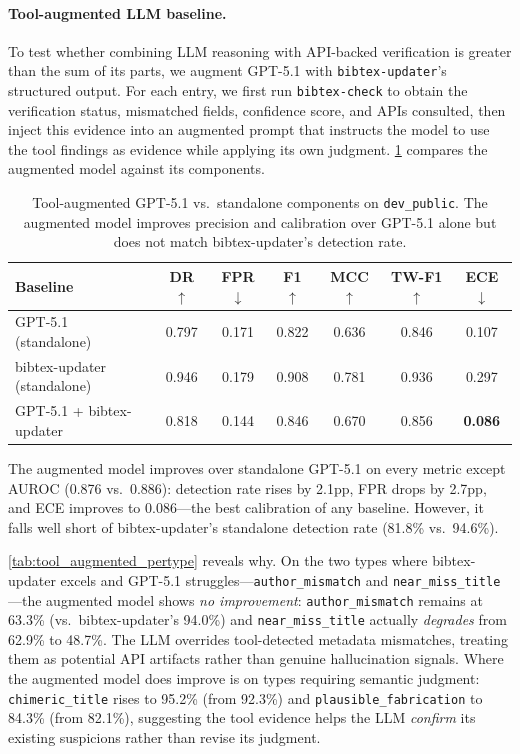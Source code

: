 \paragraph{Tool-augmented LLM baseline.}
\label{app:tool_augmented}
To test whether combining LLM reasoning with API-backed verification is greater than the sum of its parts, we augment GPT-5.1 with \texttt{bibtex-updater}'s structured output.
For each entry, we first run \texttt{bibtex-check} to obtain the verification status, mismatched fields, confidence score, and APIs consulted, then inject this evidence into an augmented prompt that instructs the model to use the tool findings as evidence while applying its own judgment.
\cref{tab:tool_augmented} compares the augmented model against its components.

\begin{table}[t]
\caption{Tool-augmented GPT-5.1 vs.\ standalone components on \texttt{dev\_public}. The augmented model improves precision and calibration over GPT-5.1 alone but does not match bibtex-updater's detection rate.}
\label{tab:tool_augmented}
\centering
\small
\begin{tabular}{lcccccc}
\toprule
\textbf{Baseline} & \textbf{DR $\uparrow$} & \textbf{FPR $\downarrow$} & \textbf{F1 $\uparrow$} & \textbf{MCC $\uparrow$} & \textbf{TW-F1 $\uparrow$} & \textbf{ECE $\downarrow$} \\
\midrule
GPT-5.1 (standalone)        & 0.797 & 0.171 & 0.822 & 0.636 & 0.846 & 0.107 \\
bibtex-updater (standalone)  & 0.946 & 0.179 & 0.908 & 0.781 & 0.936 & 0.297 \\
GPT-5.1 + bibtex-updater     & 0.818 & 0.144 & 0.846 & 0.670 & 0.856 & \textbf{0.086} \\
\bottomrule
\end{tabular}
\end{table}

The augmented model improves over standalone GPT-5.1 on every metric except AUROC (0.876 vs.\ 0.886): detection rate rises by 2.1pp, FPR drops by 2.7pp, and ECE improves to 0.086---the best calibration of any baseline.
However, it falls well short of bibtex-updater's standalone detection rate (81.8\% vs.\ 94.6\%).

\cref{tab:tool_augmented_pertype} reveals why.
On the two types where bibtex-updater excels and GPT-5.1 struggles---\texttt{author\_mismatch} and \texttt{near\_miss\_title}---the augmented model shows \emph{no improvement}: \texttt{author\_mismatch} remains at 63.3\% (vs.\ bibtex-updater's 94.0\%) and \texttt{near\_miss\_title} actually \emph{degrades} from 62.9\% to 48.7\%.
The LLM overrides tool-detected metadata mismatches, treating them as potential API artifacts rather than genuine hallucination signals.
Where the augmented model does improve is on types requiring semantic judgment: \texttt{chimeric\_title} rises to 95.2\% (from 92.3\%) and \texttt{plausible\_fabrication} to 84.3\% (from 82.1\%), suggesting the tool evidence helps the LLM \emph{confirm} its existing suspicions rather than revise its judgment.

